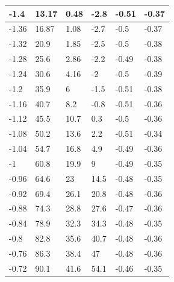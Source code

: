 \documentclass[a4paper]{ltxdoc}
\begin{document}
{\begin{longtable}{|l|l|l|l|l|l|}
        -1.4   & 13.17         & 0.48          & -2.8          & -0.51           & -0.37         \\ \hline
        -1.36  & 16.87         & 1.08          & -2.7          & -0.5            & -0.37         \\ \hline
        -1.32  & 20.9          & 1.85          & -2.5          & -0.5            & -0.38         \\ \hline
        -1.28  & 25.6          & 2.86          & -2.2          & -0.49           & -0.38         \\ \hline
        -1.24  & 30.6          & 4.16          & -2            & -0.5            & -0.39         \\ \hline
        -1.2   & 35.9          & 6             & -1.5          & -0.51           & -0.38         \\ \hline
        -1.16  & 40.7          & 8.2           & -0.8          & -0.51           & -0.36         \\ \hline
        -1.12  & 45.5          & 10.7          & 0.3           & -0.5            & -0.36         \\ \hline
        -1.08  & 50.2          & 13.6          & 2.2           & -0.51           & -0.34         \\ \hline
        -1.04  & 54.7          & 16.8          & 4.9           & -0.49           & -0.36         \\ \hline
        -1     & 60.8          & 19.9          & 9             & -0.49           & -0.35         \\ \hline
        -0.96  & 64.6          & 23            & 14.5          & -0.48           & -0.35         \\ \hline
        -0.92  & 69.4          & 26.1          & 20.8          & -0.48           & -0.36         \\ \hline
        -0.88  & 74.3          & 28.8          & 27.6          & -0.47           & -0.36         \\ \hline
        -0.84  & 78.9          & 32.3          & 34.3          & -0.48           & -0.35         \\ \hline
        -0.8   & 82.8          & 35.6          & 40.7          & -0.48           & -0.36         \\ \hline
        -0.76  & 86.3          & 38.4          & 47            & -0.48           & -0.36         \\ \hline
        -0.72  & 90.1          & 41.6          & 54.1          & -0.46           & -0.35         \\ \hline

\end{longtable}}
\end{document}
